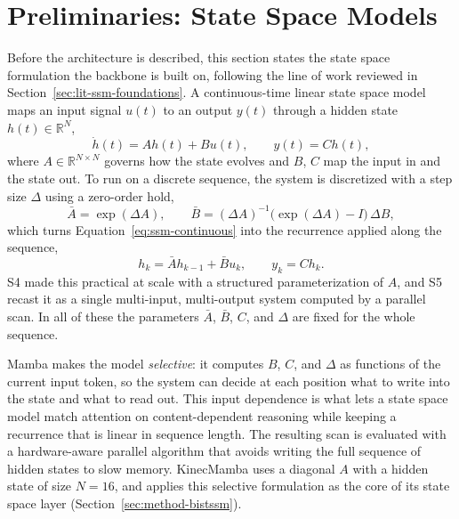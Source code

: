 \section{Preliminaries: State Space Models}
\label{sec:method-prelim}

Before the architecture is described, this section states the state space
formulation the backbone is built on, following the line of work reviewed in
Section~\ref{sec:lit-ssm-foundations}. A continuous-time linear state space
model maps an input signal $u(t)$ to an output $y(t)$ through a hidden state
$h(t) \in \mathbb{R}^{N}$,
\begin{equation}
\dot{h}(t) = A h(t) + B u(t), \qquad y(t) = C h(t),
\label{eq:ssm-continuous}
\end{equation}
where $A \in \mathbb{R}^{N \times N}$ governs how the state evolves and $B$,
$C$ map the input in and the state out. To run on a discrete sequence, the
system is discretized with a step size $\Delta$ using a zero-order hold,
\begin{equation}
\bar{A} = \exp(\Delta A), \qquad
\bar{B} = (\Delta A)^{-1}\big(\exp(\Delta A) - I\big)\, \Delta B,
\label{eq:ssm-discretize}
\end{equation}
which turns Equation~\ref{eq:ssm-continuous} into the recurrence applied along
the sequence,
\begin{equation}
h_k = \bar{A} h_{k-1} + \bar{B} u_k, \qquad y_k = C h_k .
\label{eq:ssm-recurrence}
\end{equation}
S4 \cite{gu2021s4} made this practical at scale with a structured
parameterization of $A$, and S5 \cite{smith2022s5} recast it as a single
multi-input, multi-output system computed by a parallel scan. In all of these
the parameters $\bar{A}$, $\bar{B}$, $C$, and $\Delta$ are fixed for the whole
sequence.

Mamba \cite{gu2023mamba} makes the model \emph{selective}: it computes $B$,
$C$, and $\Delta$ as functions of the current input token, so the system can
decide at each position what to write into the state and what to read out.
This input dependence is what lets a state space model match attention on
content-dependent reasoning while keeping a recurrence that is linear in
sequence length. The resulting scan is evaluated with a hardware-aware
parallel algorithm that avoids writing the full sequence of hidden states to
slow memory. KinecMamba uses a diagonal $A$ with a hidden state of size
$N=16$, and applies this selective formulation as the core of its state space
layer (Section~\ref{sec:method-bistssm}).

